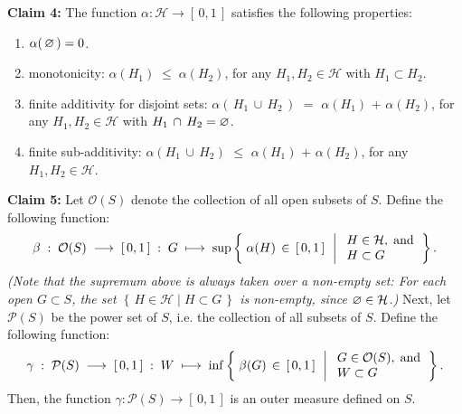 \vskip 0.5cm
\begin{center}
\begin{minipage}{6.5in}
\textbf{Claim 4:}\quad
The function $\alpha : \mathcal{H} \longrightarrow [\,0,1\,]$ satisfies the following properties:
\begin{enumerate}
\item	$\alpha(\,\varnothing\,) = 0$.
\item	monotonicity:
		$\alpha(H_{1}) \; \leq \; \alpha(H_{2})$,
		for any $H_{1}, H_{2} \in \mathcal{H}$ with $H_{1} \subset H_{2}$.
\item	finite additivity for disjoint sets:
		\vskip 0.1cm
		$\alpha(\,H_{1}\,\cup\,H_{2}\,)$ $=$ $\alpha(H_{1})$ $+$ $\alpha(H_{2})$,
		for any $H_{1}, H_{2} \in \mathcal{H}$ with $H_{1} \,\cap\, H_{2} = \varnothing$.
\item	finite sub-additivity:
		$\alpha(H_{1}\,\cup\,H_{2})$ $\leq$ $\alpha(H_{1})$ $+$ $\alpha(H_{2})$,
		for any $H_{1}, H_{2} \in \mathcal{H}$.
\end{enumerate}
\end{minipage}
\end{center}

\vskip 0.5cm
\begin{center}
\begin{minipage}{6.5in}
\textbf{Claim 5:}\quad
Let $\mathcal{O}(S)$ denote the collection of all open subsets of $S$.
Define the following function:
\begin{equation*}
\beta \; : \; \mathcal{O}(S) \;\longrightarrow\; [\,0,1\,] \; : \; G \;\longmapsto\; 
\sup\left\{\;
	\alpha(H) \,\in\, [\,0,1\,]
	\,\;\left\vert\;
		\begin{array}{l} H \in \mathcal{H}, \;\textnormal{and}\\ H \subset G \end{array}
	\right.
\right\}.
\end{equation*}
\textit{\small(Note that the supremum above is always taken over a non-empty set: For each open $G \subset S$,
the set $\left\{\,H \in \mathcal{H}\;\vert\;H \subset G\,\right\}$ is non-empty, since $\varnothing \in \mathcal{H}$.)}
\vskip 0.2cm
\noindent
Next, let $\mathcal{P}(S)$ be the power set of $S$, i.e. the collection of all subsets of $S$.
Define the following function:
\begin{equation*}
\gamma \; : \; \mathcal{P}(S) \;\longrightarrow\; [\,0,1\,] \; : \; W \;\longmapsto\; 
\inf\left\{\;
	\beta(G) \,\in\, [\,0,1\,]
	\,\;\left\vert\;
		\begin{array}{l} G \in \mathcal{O}(S), \;\textnormal{and}\\ W \subset G \end{array}
	\right.
\right\}.
\end{equation*}
Then, the function $\gamma : \mathcal{P}(S) \longrightarrow [\,0,1\,]$ is an outer measure defined on $S$.
\end{minipage}
\end{center}


